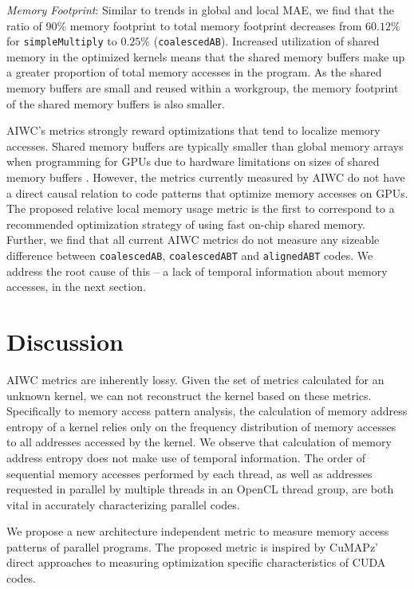 \documentclass[review=false, sigchi]{acmart}
\begin{document}
	\textit{Memory Footprint}: Similar to trends in global and local MAE, we find that the ratio of 90\% memory footprint to total memory footprint decreases from $60.12\%$ for \texttt{simpleMultiply} to $0.25\%$ (\texttt{coalescedAB}). Increased utilization of shared memory in the optimized kernels means that the shared memory buffers make up a greater proportion of total memory accesses in the program. As the shared memory buffers are small and reused within a workgroup, the memory footprint of the shared memory buffers is also smaller. 
	
	AIWC's metrics strongly reward optimizations that tend to localize memory accesses. Shared memory buffers are typically smaller than global memory arrays when programming for GPUs due to hardware limitations on sizes of shared memory buffers \cite{cudamanual}. However, the metrics currently measured by AIWC do not have a direct causal relation to code patterns that optimize memory accesses on GPUs. The proposed relative local memory usage metric is the first to correspond to a recommended optimization strategy of using fast on-chip shared memory. Further, we find that all current AIWC metrics do not measure any sizeable difference between \texttt{coalescedAB}, \texttt{coalescedABT} and \texttt{alignedABT} codes. We address the root cause of this -- a lack of temporal information about memory accesses, in the next section.%
	
	\section{Discussion } \label{discussion}
	
	AIWC metrics are inherently lossy. Given the set of metrics calculated for an unknown kernel, we can not reconstruct the kernel based on these metrics. Specifically to memory access pattern analysis, the calculation of memory address entropy of a kernel relies only on the frequency distribution of memory accesses to all addresses accessed by the kernel. We observe that calculation of memory address entropy does not make use of temporal information. The order of sequential memory accesses performed by each thread, as well as addresses requested in parallel by multiple threads in an OpenCL thread group, are both vital in accurately characterizing parallel codes.
	
	We propose a new architecture independent metric to measure memory access patterns of parallel programs. The proposed metric is inspired by CuMAPz' direct approaches to measuring optimization specific characteristics of CUDA codes.
	
\end{document}
